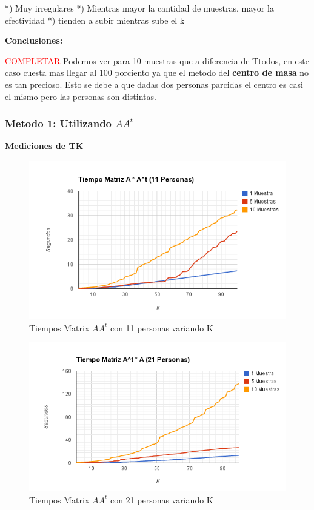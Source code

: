 *) Muy irregulares
*) Mientras mayor la cantidad de muestras, mayor la efectividad
*) tienden a subir mientras sube el k

\textbf{Conclusiones:}

\textcolor{red}{COMPLETAR}
Podemos ver para 10 muestras que a diferencia de Ttodos, en este caso cuesta mas llegar al 100 porciento ya que el metodo del \textbf{centro de masa} no es tan precioso. Esto se debe a que dadas dos personas parcidas el centro es casi el mismo pero las personas son distintas.


\subsubsection{Metodo 1: Utilizando $AA^t$}

\textbf{Mediciones de TK }

\begin{figure}[H]
\includegraphics[width=1\textwidth]{img/imagea.png}
     \caption{Tiempos Matrix $AA^t$ con 11 personas variando K}
\end{figure}

\begin{figure}[H]
\includegraphics[width=1\textwidth]{img/imageb.png}
     \caption{Tiempos Matrix $AA^t$ con 21 personas variando K}
\end{figure}

